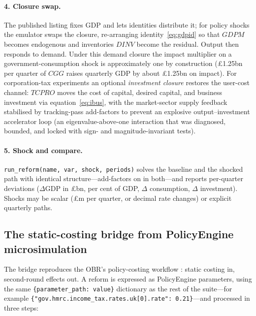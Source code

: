 \paragraph{4. Closure swap.} The published listing fixes GDP and lets identities distribute it; for policy shocks the emulator swaps the closure, re-arranging identity~\eqref{eq:gdpid} so that $GDPM$ becomes endogenous and inventories $DINV$ become the residual. Output then responds to demand. Under this demand closure the impact multiplier on a government-consumption shock is approximately one by construction (\pounds 1.25bn per quarter of $CGG$ raises quarterly GDP by about \pounds 1.25bn on impact). For corporation-tax experiments an optional \emph{investment closure} restores the user-cost channel: $TCPRO$ moves the cost of capital, desired capital, and business investment via equation~\eqref{eq:ibus}, with the market-sector supply feedback stabilised by tracking-pass add-factors to prevent an explosive output--investment accelerator loop (an eigenvalue-above-one interaction that was diagnosed, bounded, and locked with sign- and magnitude-invariant tests).

\paragraph{5. Shock and compare.} \texttt{run\_reform(name, var, shock, periods)} solves the baseline and the shocked path with identical structure---add-factors on in both---and reports per-quarter deviations ($\Delta$GDP in \pounds bn, per cent of GDP, $\Delta$ consumption, $\Delta$ investment). Shocks may be scalar (\pounds m per quarter, or decimal rate changes) or explicit quarterly paths.

\subsection{The static-costing bridge from PolicyEngine microsimulation}
\label{sec:bridge}

The bridge reproduces the OBR's policy-costing workflow \citep{obr2014costings}: static costing in, second-round effects out. A reform is expressed as PolicyEngine parameters, using the same \texttt{\{parameter\_path:\allowbreak\ value\}} dictionary as the rest of the suite---for example \texttt{\{"gov.hmrc.\allowbreak income\_tax.\allowbreak rates.\allowbreak uk[0].\allowbreak rate":\allowbreak\ 0.21\}}---and processed in three steps:

